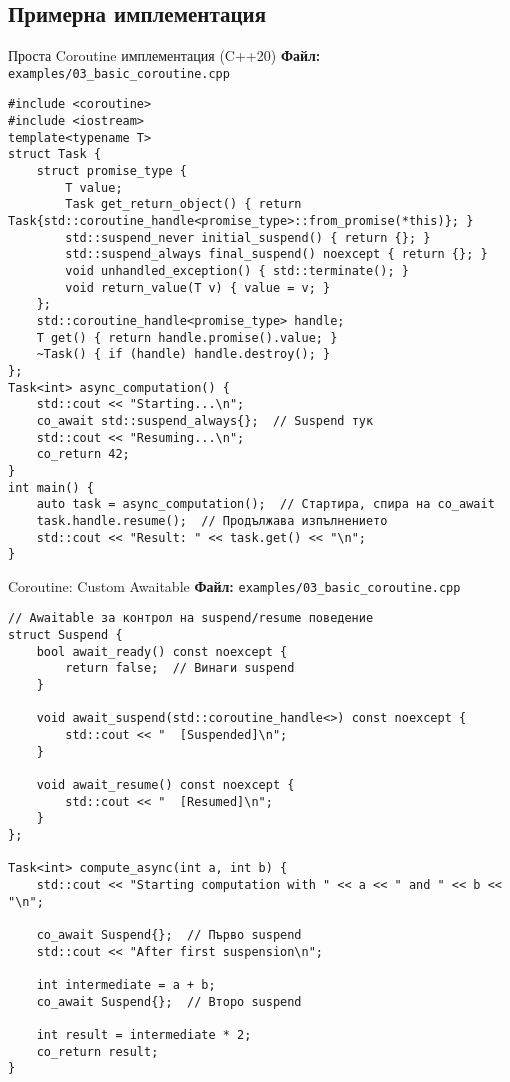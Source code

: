 \documentclass[aspectratio=169]{beamer}
\begin{document}
\subsection{Примерна имплементация}

\begin{frame}[fragile]{Проста Coroutine имплементация (C++20)}
\textbf{Файл:} \texttt{examples/03\_basic\_coroutine.cpp}
\begin{lstlisting}[basicstyle=\ttfamily\tiny]
#include <coroutine>
#include <iostream>
template<typename T>
struct Task {
    struct promise_type {
        T value;
        Task get_return_object() { return Task{std::coroutine_handle<promise_type>::from_promise(*this)}; }
        std::suspend_never initial_suspend() { return {}; }
        std::suspend_always final_suspend() noexcept { return {}; }
        void unhandled_exception() { std::terminate(); }
        void return_value(T v) { value = v; }
    };
    std::coroutine_handle<promise_type> handle;
    T get() { return handle.promise().value; }
    ~Task() { if (handle) handle.destroy(); }
};
Task<int> async_computation() {
    std::cout << "Starting...\n";
    co_await std::suspend_always{};  // Suspend тук
    std::cout << "Resuming...\n";
    co_return 42;
}
int main() {
    auto task = async_computation();  // Стартира, спира на co_await
    task.handle.resume();  // Продължава изпълнението
    std::cout << "Result: " << task.get() << "\n";
}
\end{lstlisting}
\end{frame}

\begin{frame}[fragile]{Coroutine: Custom Awaitable}
\textbf{Файл:} \texttt{examples/03\_basic\_coroutine.cpp}
\begin{lstlisting}[basicstyle=\ttfamily\tiny]
// Awaitable за контрол на suspend/resume поведение
struct Suspend {
    bool await_ready() const noexcept { 
        return false;  // Винаги suspend
    }
    
    void await_suspend(std::coroutine_handle<>) const noexcept {
        std::cout << "  [Suspended]\n";
    }
    
    void await_resume() const noexcept {
        std::cout << "  [Resumed]\n";
    }
};

Task<int> compute_async(int a, int b) {
    std::cout << "Starting computation with " << a << " and " << b << "\n";
    
    co_await Suspend{};  // Първо suspend
    std::cout << "After first suspension\n";
    
    int intermediate = a + b;
    co_await Suspend{};  // Второ suspend
    
    int result = intermediate * 2;
    co_return result;
}
\end{lstlisting}
\end{frame}
\end{document}
